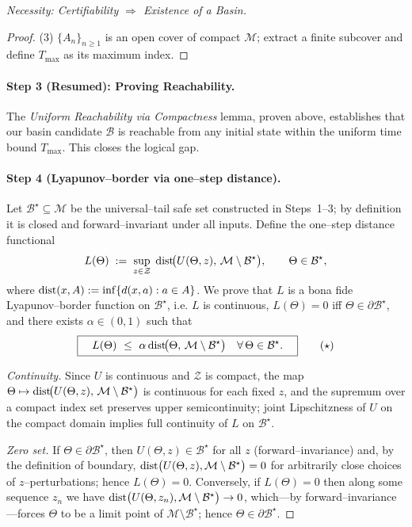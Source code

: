 \documentclass[12pt]{article}
\theoremstyle{definition}
\theoremstyle{plain}
\begin{document}
\begin{proof}[Necessity: Certifiability $\Rightarrow$ Existence of a Basin]
\begin{proof}
(3) $\{A_n\}_{n\ge1}$ is an open cover of compact $\mathcal M$; extract a finite subcover and define $T_{\max}$ as its maximum index.
\end{proof}


\paragraph{Step 3 (Resumed): Proving Reachability.}
The \textit{Uniform Reachability via Compactness} lemma, proven above, establishes that our basin candidate $\mathcal{B}$ is reachable from any initial state within the uniform time bound $T_{\max}$. This closes the logical gap.


\paragraph{Step 4 (Lyapunov–border via one–step distance).}
Let $\mathcal B^\star\subseteq\mathcal M$ be the universal–tail safe set constructed in Steps~1–3; by definition it is closed and forward–invariant under all inputs. Define the one–step distance functional
\[
L(\Theta)\;:=\;\sup_{z\in\mathcal Z}\;{\rm dist}\!\bigl(U(\Theta,z),\,\mathcal M\setminus\mathcal B^\star\bigr),
\qquad \Theta\in\mathcal B^\star,
\]
where ${\rm dist}(x,A):=\inf\{d(x,a):a\in A\}$. We prove that $L$ is a bona fide Lyapunov–border function on $\mathcal B^\star$, i.e. $L$ is continuous, $L(\Theta)=0$ iff $\Theta\in\partial\mathcal B^\star$, and there exists $\alpha\in(0,1)$ such that
\[
\boxed{\quad L(\Theta)\ \le\ \alpha\,{\rm dist}\!\bigl(\Theta,\,\mathcal M\setminus\mathcal B^\star\bigr)\quad\forall\,\Theta\in\mathcal B^\star. \quad}
\tag{$\star$}
\]

\emph{Continuity.} Since $U$ is continuous and $\mathcal Z$ is compact, the map
$\Theta\mapsto {\rm dist}\!\bigl(U(\Theta,z),\,\mathcal M\setminus\mathcal B^\star\bigr)$
is continuous for each fixed $z$, and the supremum over a compact index set preserves upper semicontinuity; joint Lipschitzness of $U$ on the compact domain implies full continuity of $L$ on $\mathcal B^\star$.

\emph{Zero set.} If $\Theta\in\partial\mathcal B^\star$, then $U(\Theta,z)\in\mathcal B^\star$ for all $z$ (forward–invariance) and, by the definition of boundary, ${\rm dist}\bigl(U(\Theta,z),\mathcal M\setminus\mathcal B^\star\bigr)=0$ for arbitrarily close choices of $z$–perturbations; hence $L(\Theta)=0$. Conversely, if $L(\Theta)=0$ then along some sequence $z_n$ we have ${\rm dist}\bigl(U(\Theta,z_n),\mathcal M\setminus\mathcal B^\star\bigr)\to0$, which—by forward–invariance—forces $\Theta$ to be a limit point of $\mathcal M\setminus\mathcal B^\star$; hence $\Theta\in\partial\mathcal B^\star$.


\end{proof}
\end{document}
